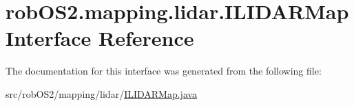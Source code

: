 \hypertarget{interfacerob_o_s2_1_1mapping_1_1lidar_1_1_i_l_i_d_a_r_map}{
\section{robOS2.mapping.lidar.ILIDARMap Interface Reference}
\label{interfacerob_o_s2_1_1mapping_1_1lidar_1_1_i_l_i_d_a_r_map}
}


The documentation for this interface was generated from the following file:\begin{DoxyCompactItemize}
\item 
src/robOS2/mapping/lidar/\hyperlink{_i_l_i_d_a_r_map_8java}{ILIDARMap.java}\end{DoxyCompactItemize}

